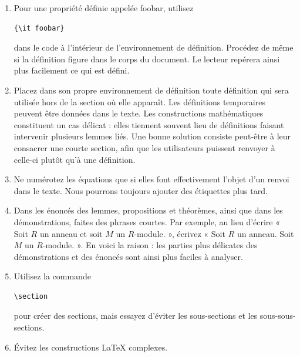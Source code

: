 \begin{enumerate}
DVI. On peut toujours y parvenir en scindant la démonstration en lemmes, entre
autres.
\item Pour une propriété définie appelée foobar, utilisez
\begin{verbatim}
{\it foobar}
\end{verbatim}
dans le code à l'intérieur de l'environnement de définition.
Procédez de même si la définition figure dans le corps du document.
Le lecteur repérera ainsi plus facilement ce qui est défini.
\item Placez dans son propre environnement de définition toute définition qui
sera utilisée hors de la section où elle apparaît. Les définitions temporaires
peuvent être données dans le texte. Les constructions mathématiques constituent
un cas délicat : elles tiennent souvent lieu de définitions faisant intervenir
plusieurs lemmes liés. Une bonne solution consiste peut-être à leur consacrer
une courte section, afin que les utilisateurs puissent renvoyer à celle-ci
plutôt qu'à une définition.
\item Ne numérotez les équations que si elles font effectivement l'objet d'un
renvoi dans le texte. Nous pourrons toujours ajouter des étiquettes plus tard.
\item Dans les énoncés des lemmes, propositions et théorèmes, ainsi que dans les
démonstrations, faites des phrases courtes. Par exemple, au lieu d'écrire
« Soit $R$ un anneau et soit $M$ un $R$-module. », écrivez « Soit $R$ un
anneau. Soit $M$ un $R$-module. ». En voici la raison : les parties plus
délicates des démonstrations et des énoncés sont ainsi plus faciles à analyser.
\item Utilisez la commande
\begin{verbatim}
\section
\end{verbatim}
pour créer des sections, mais essayez d'éviter les sous-sections et les
sous-sous-sections.
\item Évitez les constructions LaTeX complexes.
\end{enumerate}












